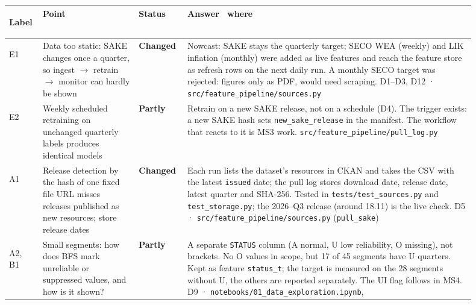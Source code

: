\documentclass[11pt,a4paper]{article}
\newcommand{\file}[1]{\texttt{#1}}
\newcommand{\changed}{\textbf{\color{statusChanged}Changed}}
\newcommand{\partly}{\textbf{\color{statusPartly}Partly}}
\begin{document}
	\begingroup
	\small
	\renewcommand{\arraystretch}{1.0}
	\begin{longtable}{>{\bfseries\raggedright\arraybackslash}p{0.055\linewidth} R{0.19\linewidth} R{0.085\linewidth} R{0.575\linewidth}}
		\toprule
		Label & \textbf{Point} & \textbf{Status} & \textbf{Answer \textperiodcentered\ where} \\
		\midrule
		\endhead
		E1  & Data too static: SAKE changes once a quarter, so ingest $\rightarrow$
		retrain $\rightarrow$ monitor can hardly be shown & \changed &
		Nowcast: SAKE stays the quarterly target; SECO WEA (weekly) and LIK inflation (monthly) were added as live
		features and reach the feature store as refresh rows on the next daily run. A monthly SECO target was rejected:
		figures only as PDF, would need scraping.
		\newline D1--D3, D12 · \file{src/feature\_pipeline/sources.py} \\ \addlinespace[0.3em]
		E2 & Weekly scheduled retraining on unchanged quarterly labels produces identical models & \partly &
		Retrain on a new SAKE release, not on a schedule (D4). The trigger exists: a new SAKE hash sets
		\texttt{new\_sake\_release} in the manifest. The workflow that reacts to it is MS3 work. \newline \file{src/feature\_pipeline/pull\_log.py} \\ \addlinespace[0.3em]
		A1 & Release detection by the hash of one fixed file URL misses releases published as new resources; store release
		dates & \changed &
		Each run lists the dataset's resources in CKAN and takes the CSV with the latest \texttt{issued} date; the pull log
		stores download date, release date, latest quarter and SHA-256. Tested in \file{tests/test\_sources.py} and
		\file{test\_storage.py}; the 2026--Q3 release (around 18.11) is the live check.
		\newline D5 · \file{src/feature\_pipeline/sources.py} (\texttt{pull\_sake}) \\ \addlinespace[0.3em]
		A2, B1 & Small segments: how does BFS mark unreliable or suppressed values, and how is it shown? & \partly &
		A separate \texttt{STATUS} column (A normal, U low reliability, O missing), not brackets. No O values in scope,
		but 17 of 45 segments have U quarters. Kept as feature \texttt{status\_t}; the target is measured on the 28
		segments without U, the others are reported separately. The UI flag follows in MS4. \newline D9 · \file{notebooks/01\_data\_exploration.ipynb},

\end{longtable}
\end{document}
